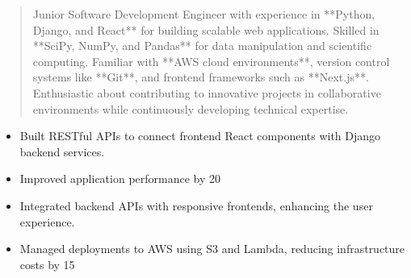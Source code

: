



\makecvheader

\begin{quote}
  \noindent
  Junior Software Development Engineer with experience in **Python, Django, and React** for building scalable web applications. Skilled in **SciPy, NumPy, and Pandas** for data manipulation and scientific computing. Familiar with **AWS cloud environments**, version control systems like **Git**, and frontend frameworks such as **Next.js**. Enthusiastic about contributing to innovative projects in collaborative environments while continuously developing technical expertise.
\end{quote}

\par\smallskip
\noindent
\begin{minipage}{20cm}
  \begin{minipage}{9.75cm}
    \begin{itemize}
      \item Built RESTful APIs to connect frontend React components with Django backend services.
      \item Improved application performance by 20%
    \end{itemize}
  \end{minipage}
  \hfill
  \begin{minipage}{9.75cm}
    \begin{itemize}
      \item Integrated backend APIs with responsive frontends, enhancing the user experience.
      \item Managed deployments to AWS using S3 and Lambda, reducing infrastructure costs by 15%
    \end{itemize}
  \end{minipage}
\end{minipage}
\par\smallskip
\divider

